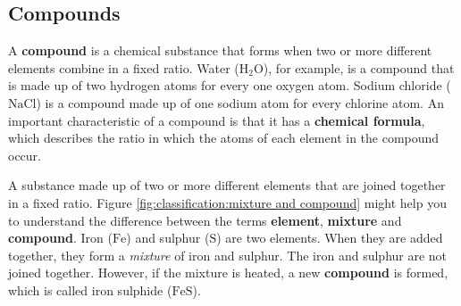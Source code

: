             \subsection*{Compounds}
            \nopagebreak
        \label{m38708*id63363}A \textbf{compound} is a chemical substance that forms when two or more different elements combine in a fixed ratio. Water ($\mathrm{H}{}_{2}\mathrm{O}$), for example, is a compound that is made up of two hydrogen atoms for every one oxygen atom. Sodium chloride ($\mathrm{NaCl}$) is a compound made up of one sodium atom for every chlorine atom. An important characteristic of a compound is that it has a \textbf{chemical formula}, which describes the ratio in which the atoms of each element in the compound occur.\par 
\label{m38708*fhsst!!!underscore!!!id201}
 { \label{m38708*meaningfhsst!!!underscore!!!id201}
        A substance made up of two or more different elements that are joined together in a fixed ratio.
         } 
        \label{m38708*id63410} Figure \ref{fig:classification:mixture and compound} might help you to understand the difference between the terms \textbf{element}, \textbf{mixture} and \textbf{compound}. Iron ($\mathrm{Fe}$) and sulphur ($\mathrm{S}$) are two elements. When they are added together, they form a \textsl{mixture} of iron and sulphur. The iron and sulphur are not joined together. However, if the mixture is heated, a new \textbf{compound} is formed, which is called iron sulphide ($\mathrm{FeS}$). \par 
    \setcounter{subfigure}{0}
